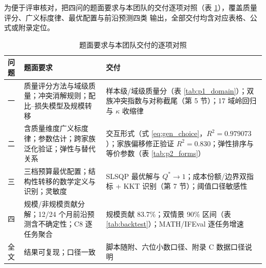 为便于评审核对，把四问的题面要求与本团队的交付逐项对照（表
\ref{tab:checklist}），覆盖质量评分、广义标度律、最优配置与前沿预测四类
输出，全部交付均含对应表格、公式或附录定位。

\begin{table}[htbp]
\centering
\caption{题面要求与本团队交付的逐项对照}
\label{tab:checklist}
\small
\begin{tabular}{>{\raggedright\arraybackslash}p{1.7cm}|>{\raggedright\arraybackslash}p{5.2cm}|>{\raggedright\arraybackslash}p{3.4cm}}
\toprule
问题 & 题面要求 & 交付 \\
\midrule
一 & 质量评分方法与域级质量；冲突消解规则；配比--损失模型及规模转移 & 样本级/域级质量分（表 \ref{tab:p1_domain}）；双族冲突指数与对称截尾（第 5 节）；17 域岭回归与 $\kappa$ 收缩律 \\
二 & 含质量维度广义标度律；参数估计；跨家族泛化验证；弹性与替代关系 & 交互形式（式 \ref{eq:gen_choice}，$R^2=0.979073$）；家族偏移修正验证 $R^2=0.830$；弹性排序与等价参数（表 \ref{tab:p2_forms}） \\
三 & 三档预算最优配置；结构性转移的数学定义与识别；灵敏度 & SLSQP 最优解与 $Q^{*}\to1$；成本份额/边界双指标 + KKT 识别（第 7 节）；阈值口径敏感性 \\
四 & 规模/非规模贡献分解；12/24 个月前沿预测含不确定性；C8 逐任务聚合 & 规模贡献 83.7\%；双情景 90\% 区间（表 \ref{tab:backtest}）；MATH/IFEval 逐任务增速 \\
全文 & 结果可复现；口径一致 & 脚本随附、六位小数口径、附录 C 数据口径说明 \\
\bottomrule
\end{tabular}
\end{table}
